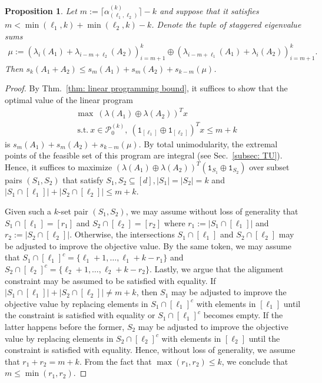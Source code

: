 \documentclass[12pt]{article}
\newtheorem{prop}[thm]{Proposition}
\theoremstyle{definition}
\numberwithin{equation}{section}
\numberwithin{equation}{section}
\newcommand{\al}{\alpha}
\newcommand{\la}{\lambda}
\newcommand{\one}{\mathtt{1}}
\newcommand{\cP}{\mathcal{P}}
\begin{document}
\begin{prop}
\label{prop: inequality for s_k based on ell_1, ell_2}
Let \(m := \lceil \al_{(\ell_1, \ell_2)}^{(k)} \rceil - k\) and suppose that it satisfies \(m < \min(\ell_1, k) + \min(\ell_2, k) - k\). Denote the tuple of staggered eigenvalue sums
\begin{align}
\label{def: staggered vec}
   \mu := (\la_i (A_1) + \la_{i - m + \ell_2} (A_2))_{i=m+1}^k \oplus (\la_{i-m+\ell_1} (A_1) + \la_i(A_2))_{i=m+1}^k.
\end{align}
Then \(s_k (A_1 + A_2) \leq s_{m} (A_1) + s_{m} (A_2) + s_{k - m} (\mu)\).
\end{prop}


\begin{proof}
By Thm.~\ref{thm: linear programming bound}, it suffices to show that the optimal value of the linear program
\begin{equation}
\label{def: lin prog for stagg}
\begin{aligned}
&\max \: (\la (A_1) \oplus \la(A_2))^T x\\
&\: \text{s.t.} \: x \in \cP_0^{(k)}, \:(\one_{[\ell_1]} \oplus \one_{[\ell_2]})^T x \leq m+k
\end{aligned}
\end{equation}
is \(s_{m} (A_1) + s_{m} (A_2) + s_{k-m} (\mu)\). By total unimodularity, the extremal points of the feasible set of this program are integral (see Sec.~\ref{subsec: TU}). Hence, it suffices to maximize \((\la (A_1) \oplus \la(A_2))^T (\one_{S_1} \oplus \one_{S_2})\) over subset pairs \((S_1, S_2)\) that satisfy \(S_1, S_2 \subseteq [d], |S_1| = |S_2|=k\) and \(| S_1 \cap [\ell_1]| + | S_2 \cap [\ell_2]| \leq m + k.\) 

Given such a \(k\)-set pair \((S_1, S_2)\), we may assume without loss of generality that \(S_1 \cap [\ell_1] = [r_1]\) and \(S_2 \cap [\ell_2] = [r_2]\) where \(r_1 := |S_1 \cap [\ell_1]|\) and \(r_2 := |S_2 \cap [\ell_2]|\). Otherwise, the intersections \(S_1 \cap [\ell_1]\) and \(S_2 \cap [\ell_2]\) may be adjusted to improve the objective value. By the same token, we may assume that \(S_1 \cap [\ell_1]^{c} = \{\ell_1 + 1, \ldots,\ell_1 + k - r_1\}\) and \(S_2 \cap [\ell_2]^c = \{\ell_2 + 1, \ldots, \ell_2 + k - r_2\}\).  Lastly, we argue that the alignment constraint may be assumed to be satisfied with equality. If \(| S_1 \cap [\ell_1]| + | S_2 \cap [\ell_2]| \neq m + k\), then \(S_1\) may be adjusted to improve the objective value by replacing elements in \(S_1 \cap [\ell_1]^{c}\) with elements in \([\ell_1]\) until the constraint is satisfied with equality or \(S_1 \cap [\ell_1]^{c}\) becomes empty. If the latter happens before the former, \(S_2\) may be adjusted to improve the objective value by replacing elements in \(S_2 \cap [\ell_2]^c\) with elements in \([\ell_2]\) until the constraint is satisfied with equality. Hence, without loss of generality, we assume that \(r_1 + r_2 = m + k\). From the fact that \(\max(r_1, r_2) \leq k\), we conclude that \(m \leq \min(r_1, r_2)\).



\end{proof}
\end{document}
